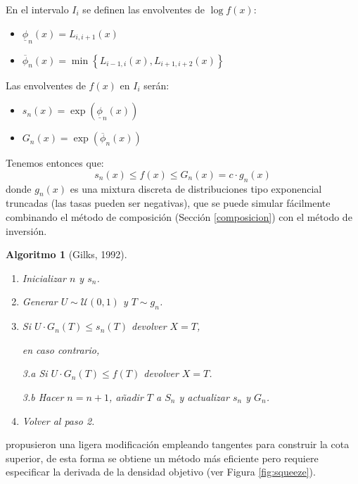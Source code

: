 \documentclass[
  10pt,
]{book}
\theoremstyle{break}
\newtheorem{conjecture}{Algoritmo}[chapter]
\theoremstyle{nonumberplain}
\begin{document}
En el intervalo \(I_{i}\) se definen las envolventes de \(\log f\left( x\right)\):

\begin{itemize}
\item
  \(\underline{\phi}_n(x)=L_{i,i+1}(x)\)
\item
  \(\overline{\phi}_n(x)=\min \left\{L_{i-1,i}(x),L_{i+1,i+2}(x)\right\}\)
\end{itemize}

Las envolventes de \(f(x)\) en \(I_{i}\) serán:

\begin{itemize}
\item
  \(s_n(x)=\exp \left( \underline{\phi}_n(x)\right)\)
\item
  \(G_n(x)=\exp \left( \overline{\phi}_n(x)\right)\)
\end{itemize}

Tenemos entonces que:
\[s_n(x)\leq f(x) \leq G_n(x)=c\cdot g_n(x)\]
donde \(g_n(x)\) es una mixtura discreta de distribuciones tipo exponencial truncadas (las tasas pueden ser negativas), que se puede simular fácilmente combinando el método de composición (Sección \ref{composicion}) con el método de inversión.

\begin{conjecture}[Gilks, 1992]
\protect\hypertarget{cnj:gilks}{}\label{cnj:gilks}

\begin{enumerate}
\def\labelenumi{\arabic{enumi}.}
\item
  Inicializar \(n\) y \(s_n\).
\item
  Generar \(U \sim \mathcal{U}(0, 1)\) y \(T\sim g_n\).
\item
  Si \(U\cdot G_n(T) \leq s_n(T)\) devolver \(X=T\),

  en caso contrario,

  3.a Si \(U\cdot G_n(T) \leq f(T)\) devolver \(X=T\).

  3.b Hacer \(n=n+1\), añadir \(T\) a \(S_n\) y actualizar \(s_n\) y \(G_n\).
\item
  Volver al paso 2.
\end{enumerate}

\end{conjecture}

\citet{gilks1992} propusieron una ligera modificación empleando tangentes para construir la cota superior, de esta forma se obtiene un método más eficiente pero requiere especificar la derivada de la densidad objetivo (ver Figura \ref{fig:squeeze}).
\end{document}
